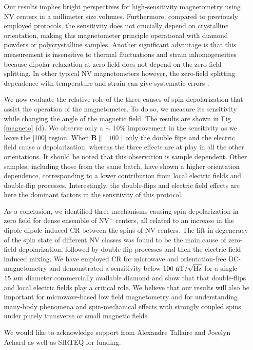 \documentclass[preprintnumbers,amsmath,amssymb,superscriptaddress,twocolumn,showpacs]{revtex4-2}
\begin{document}
Our results implies bright perspectives for high-sensitivity magnetometry using NV centers in a millimeter size volumes. Furthermore, compared to previously employed protocols, the sensitivity does not crucially depend on crystalline orientation, making this magnetometer principle operational with diamond powders or polycrystalline samples. Another significant advantage is that this measurement is insensitive to thermal fluctuations and strain inhomogeneities because dipolar-relaxation at zero-field does not depend on the zero-field splitting. In other typical NV magnetometers however, the zero-field splitting dependence with temperature and strain can give systematic errors \cite{Bauch, Barry}. 


We now evaluate the relative role of the three causes of spin depolarization that assist the operation of the magnetometer. To do so, we measure its sensitivity while changing the angle of the magnetic field.  The results are shown in Fig. \ref{magneto} (d). We observe only a $\sim$ 10\% improvement in the sensitivity as we leave the [100] region.
When $\bm B \parallel [100]$ only the double flips and the electric field cause a depolarization, whereas the three effects are at play in all the other orientations. It should be noted that this observation is sample dependent. Other samples, including those from the same batch, have shown a higher orientation dependence, corresponding to a lower contribution from local electric fields and double-flip processes.
Interestingly, the double-flips and electric field effects are here the dominant factors in the sensitivity of this protocol. 

As a conclusion, we identified three mechanisms causing spin depolarization in zero field for dense ensemble of NV$^-$ centers, all related to an increase in the dipole-dipole induced CR between the spins of NV centers. The lift in degeneracy of the spin state of different NV classes was found to be the main cause of zero-field depolarization, followed by double-flip processes and then the electric field induced mixing. We have employed CR for microwave and orientation-free DC-magnetometry and demonstrated a sensitivity below $100\ \rm{nT}/\sqrt{\rm Hz}$ for a single $15\ \mu \rm m$ diameter commercially available diamond and show that that double-flips and local electric fields play a critical role. 
We believe that our results will also be important for microwave-based low field magnetometry \cite{Vetter_LFM, WangRB} and for understanding many-body phenomena \citep{kucsko2018critical, ChoiNat, ZuYao, dwyer2021probing} and spin-mechanical effects \cite{pellet2021magnetic} with strongly coupled spins under purely transverse or small magnetic fields. 

\begin{acknowledgments}

We would like to acknowledge support from Alexandre Tallaire and Jocelyn Achard as well as 
SIRTEQ for funding.

\end{acknowledgments}

{}
\end{document}
